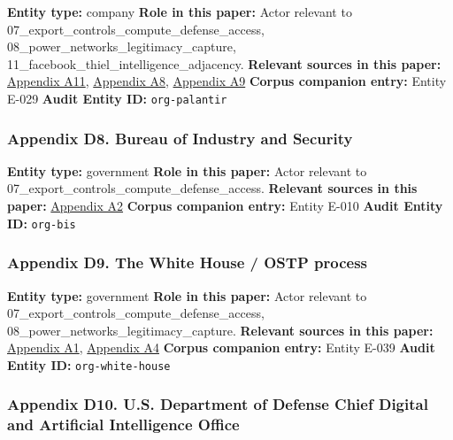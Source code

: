 \documentclass[
  american,
  11pt,
  letterpaper,
]{article}
\begin{document}
\textbf{Entity type:} company \textbf{Role in this paper:} Actor
relevant to 07\_export\_controls\_compute\_defense\_access,
08\_power\_networks\_legitimacy\_capture,
11\_facebook\_thiel\_intelligence\_adjacency. \textbf{Relevant sources
in this paper:} \hyperref[appendix-a11-gotham]{Appendix A11},
\hyperref[appendix-a8-anthropic-and-palantir-partner-to-bring-claude-ai-models-to-aws-for-u-s-government-intelligence-and-defense-operations]{Appendix
A8},
\hyperref[appendix-a9-army-launches-detachment-201-executive-innovation-corps-to-drive-tech-transformation]{Appendix
A9} \textbf{Corpus companion entry:} Entity E-029 \textbf{Audit Entity
ID:} \texttt{org-palantir}

\subsubsection{Appendix D8. Bureau of Industry and
Security}\label{appendix-d8-bureau-of-industry-and-security}

\textbf{Entity type:} government \textbf{Role in this paper:} Actor
relevant to 07\_export\_controls\_compute\_defense\_access.
\textbf{Relevant sources in this paper:}
\hyperref[appendix-a2-guidance-regarding-enforcement-of-license-requirements-for-advanced-computing-items-for-entities-headquartered-in-country-group-d-5-and-macau]{Appendix
A2} \textbf{Corpus companion entry:} Entity E-010 \textbf{Audit Entity
ID:} \texttt{org-bis}

\subsubsection{Appendix D9. The White House / OSTP
process}\label{appendix-d9-the-white-house-ostp-process}

\textbf{Entity type:} government \textbf{Role in this paper:} Actor
relevant to 07\_export\_controls\_compute\_defense\_access,
08\_power\_networks\_legitimacy\_capture. \textbf{Relevant sources in
this paper:}
\hyperref[appendix-a1-removing-barriers-to-american-leadership-in-artificial-intelligence]{Appendix
A1},
\hyperref[appendix-a4-request-for-information-on-the-development-of-an-artificial-intelligence-ai-action-plan]{Appendix
A4} \textbf{Corpus companion entry:} Entity E-039 \textbf{Audit Entity
ID:} \texttt{org-white-house}

\subsubsection{Appendix D10. U.S. Department of Defense Chief Digital
and Artificial Intelligence
Office}\label{appendix-d10-u-s-department-of-defense-chief-digital-and-artificial-intelligence-office}
\end{document}
